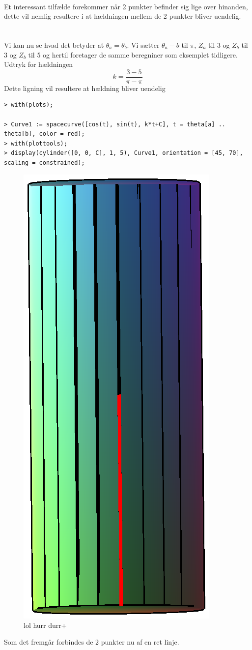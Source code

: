 \\
Et interessant tilfælde forekommer når 2 punkter befinder sig lige over hinanden, dette vil nemlig resultere i at hældningen mellem de 2 punkter bliver uendelig.
\\
\\
\\
Vi kan nu se hvad det betyder at $\theta_a=\theta_b$. Vi sætter $\theta_a-b$ til $\pi$, $Z_a$ til 3 og $Z_b$ til 3 og $Z_b$ til 5 og hertil foretager de samme beregniner som eksemplet tidligere.
\\
Udtryk for hældningen
\begin{equation}
k=\frac{3-5}{\pi-\pi}
\end{equation}
Dette ligning vil resultere at hældning bliver uendelig
\begin{lstlisting}
> with(plots);

> Curve1 := spacecurve([cos(t), sin(t), k*t+C], t = theta[a] .. theta[b], color = red);
> with(plottools);
> display(cylinder([0, 0, C], 1, 5), Curve1, orientation = [45, 70], scaling = constrained);
\end{lstlisting}
\begin{figure}
\center
\includegraphics[scale=0.4]{pictures/Opg8_Fig4.eps}
\caption{lol hurr durr+}
\end{figure}
Som det fremgår forbindes de 2 punkter nu af en ret linje.

